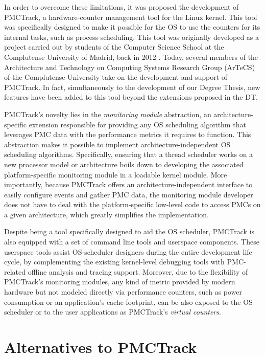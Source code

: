 In order to overcome these limitations, it was proposed the development
of PMCTrack, a hardware-counter management tool for the Linux kernel. This tool was specifically designed to make it possible for the OS to use the counters for its internal tasks, such as process scheduling. This tool was originally
developed as a project carried out by students of the Computer Science School at the Complutense University of Madrid, back in 2012 \cite{MSDTFG12}. Today, several members of the Architecture and Technology on Computing Systems Research Group (ArTeCS) of the Complutense University take on the development and support of PMCTrack. In fact, simultaneously to the development of our Degree Thesis, new
features have been added to this tool beyond the extensions proposed in
the DT.

PMCTrack's novelty lies in the \textit{monitoring module} abstraction,
an architecture-specific extension responsible for providing any OS
scheduling algorithm that leverages PMC data with the performance
metrics it requires to function. This abstraction makes it possible to
implement architecture-independent OS scheduling algorithms.
Specifically, ensuring that a thread scheduler works on a new processor
model or architecture boils down to developing the associated
platform-specific monitoring module in a loadable kernel module. More
importantly, because PMCTrack offers an architecture-independent
interface to easily configure events and gather PMC data, the monitoring
module developer does not have to deal with the platform-specific
low-level code to access PMCs on a given architecture, which greatly
simplifies the implementation.

Despite being a tool specifically designed to aid the OS scheduler,
PMCTrack is also equipped with a set of command line tools and userspace
components. These userspace tools assist OS-scheduler designers during
the entire development life cycle, by complementing the existing
kernel-level debugging tools with PMC-related offline analysis and
tracing support. Moreover, due to the flexibility of PMCTrack's
monitoring modules, any kind of metric provided by modern hardware but
not modeled directly via performance counters, such as power consumption
or an application's cache footprint, can be also exposed to the OS
scheduler or to the user applications as PMCTrack's
\textit{virtual counters}.

\section{Alternatives to PMCTrack}\label{alternatives-to-pmctrack}

